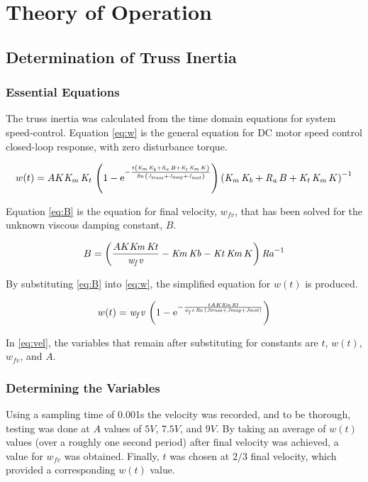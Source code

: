 \section{Theory of Operation}

\subsection{Determination of Truss Inertia}

\subsubsection{Essential Equations}
The truss inertia was calculated from the time domain equations for system speed-control.
Equation \ref{eq:w} is the general equation for DC motor speed control closed-loop response, with zero disturbance torque.

\begin{equation}
\label{eq:w}
w(t) = AK{\it K_m}\,{\it K_t}\, \left( 1-{{\rm e}^{-{\frac {t \left( {\it K_m}\,
{\it K_b}+{\it R_a}\,B+{\it K_t}\,{\it K_m}\,K \right) }{{\it Ra}\,
 \left( {\it J_{truss}}+{\it J_{mag}}+{\it J_{mot}} \right) }}}} \right) 
 \left( {\it K_m}\,{\it K_b}+{\it R_a}\,B+{\it K_t}\,{\it K_m}\,K \right) ^
{-1}
\end{equation}

Equation \ref{eq:B} is the equation for final velocity, $w_{fv}$, that has been solved for the unknown viscous damping constant, $B$.

\begin{equation}
\label{eq:B}
B =  \left( {\frac {AK{\it Km}\,{\it Kt}}{{\it w_fv}}}-{\it Km}\,{\it Kb}-{
\it Kt}\,{\it Km}\,K \right) {{\it Ra}}^{-1}
\end{equation}

By substituting \ref{eq:B} into \ref{eq:w}, the simplified equation for $w(t)$ is produced.

\begin{equation}
\label{eq:vel}
w(t) = {\it w_fv}\, \left( 1-{{\rm e}^{-{\frac {tAK{\it Km}\,{\it Kt}}{{\it 
w_fv}\,{\it Ra}\, \left( {\it Jtruss}+{\it Jmag}+{\it Jmot} \right) }}}}
 \right) 
\end{equation}

In \ref{eq:vel}, the variables that remain after substituting for constants are $t$, $w(t)$, $w_{fv}$, and $A$. 

\subsubsection{Determining the Variables}
Using a sampling time of 0.001s the velocity was recorded, and to be thorough, testing was done at $A$ values of $5V$, $7.5V$, and $9V$. By taking an average of $w(t)$ values (over a roughly one second period) after final velocity was achieved, a value for $w_{fv}$ was obtained. Finally, $t$ was chosen at $2/3$ final velocity, which provided a  corresponding $w(t)$ value.

